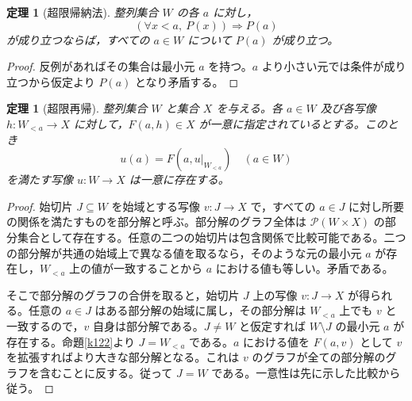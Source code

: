 \documentclass[a5paper,10pt,dvipdfmx]{jsarticle}
\theoremstyle{definition}
\theoremstyle{plain}
\newtheorem{thm}[ruledef]{定理}
\newcommand{\impc}{\Longrightarrow}
\newcommand{\Pow}{\mathcal{P}}
\begin{document}
\begin{thm}[超限帰納法]\label{k123}
整列集合 $W$ の各 $a$ に対し，
\[ (\forall x<a,\ P(x))\impc P(a) \]
が成り立つならば，すべての $a\in W$ について $P(a)$ が成り立つ。
\end{thm}
\begin{proof}
反例があればその集合は最小元 $a$ を持つ。$a$ より小さい元では条件が成り立つから仮定より $P(a)$ となり矛盾する。
\end{proof}
\begin{thm}[超限再帰]\label{k124}
整列集合 $W$ と集合 $X$ を与える。各 $a\in W$ 及び各写像 $h\colon W_{<a}\to X$ に対して，$F(a,h)\in X$ が一意に指定されているとする。このとき
\[ u(a)=F(a,u|_{W_{<a}})\quad(a\in W) \]
を満たす写像 $u\colon W\to X$ は一意に存在する。
\end{thm}
\begin{proof}
始切片 $J\subseteq W$ を始域とする写像 $v\colon J\to X$ で，すべての $a\in J$ に対し所要の関係を満たすものを部分解と呼ぶ。部分解のグラフ全体は $\Pow(W\times X)$ の部分集合として存在する。任意の二つの始切片は包含関係で比較可能である。二つの部分解が共通の始域上で異なる値を取るなら，そのような元の最小元 $a$ が存在し，$W_{<a}$ 上の値が一致することから $a$ における値も等しい。矛盾である。

そこで部分解のグラフの合併を取ると，始切片 $J$ 上の写像 $v\colon J\to X$ が得られる。任意の $a\in J$ はある部分解の始域に属し，その部分解は $W_{<a}$ 上でも $v$ と一致するので，$v$ 自身は部分解である。$J\ne W$ と仮定すれば $W\setminus J$ の最小元 $a$ が存在する。命題\ref{k122}より $J=W_{<a}$ である。$a$ における値を $F(a,v)$ として $v$ を拡張すればより大きな部分解となる。これは $v$ のグラフが全ての部分解のグラフを含むことに反する。従って $J=W$ である。一意性は先に示した比較から従う。
\end{proof}
\end{document}
